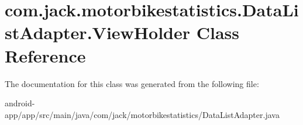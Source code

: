 \hypertarget{classcom_1_1jack_1_1motorbikestatistics_1_1_data_list_adapter_1_1_view_holder}{}\section{com.\+jack.\+motorbikestatistics.\+Data\+List\+Adapter.\+View\+Holder Class Reference}
\label{classcom_1_1jack_1_1motorbikestatistics_1_1_data_list_adapter_1_1_view_holder}


The documentation for this class was generated from the following file\+:\begin{DoxyCompactItemize}
\item 
android-\/app/app/src/main/java/com/jack/motorbikestatistics/Data\+List\+Adapter.\+java\end{DoxyCompactItemize}
